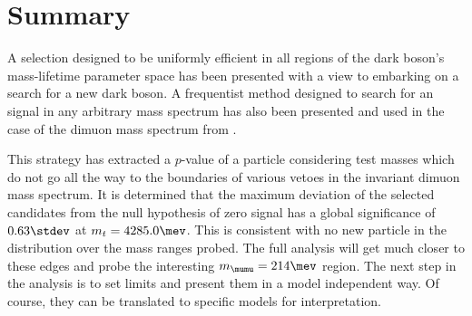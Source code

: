 \section{Summary}

A selection designed to be uniformly efficient in all regions of the dark boson's mass-lifetime
parameter space has been presented with a view to embarking on a search for a new dark boson.
A frequentist method designed to search for an signal in any arbitrary mass spectrum has also been
presented and used in the case of the dimuon mass spectrum from \btokstrmumu.

This strategy has extracted a $p$-value of a particle considering test masses which do not go all
the way to the boundaries of various vetoes in the invariant dimuon mass spectrum.
It is determined that the maximum deviation of the selected candidates from the null hypothesis of
zero signal has a global significance of $0.63\stdev$ at $m_t = 4285.0\mev$.
This is consistent with no new particle in the \mumu distribution over the mass ranges probed.
The full analysis will get much closer to these edges and probe the interesting $m_{\mumu}=214\mev$
region.
The next step in the analysis is to set limits and present them in a model independent way.
Of course, they can be translated to specific models for interpretation.



